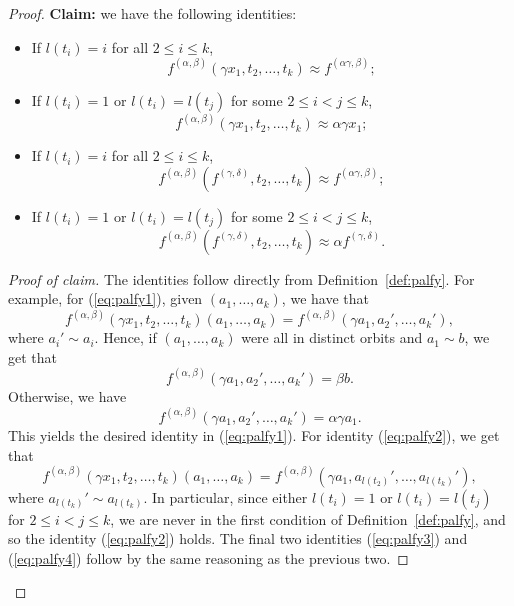 \documentclass[10pt,a4paper]{amsart}
\begin{document}
\begin{proof}
\textbf{Claim:} we have the following identities:
\begin{itemize}
    \item If $l(t_i)=i$ for all $2\leq i\leq k$,
    \begin{equation}\label{eq:palfy1}
        f^{(\alpha, \beta)}(\gamma x_1, t_2, \dots, t_k)\approx f^{(\alpha \gamma, \beta)};
    \end{equation}
    \item If $l(t_i)=1$ or $l(t_i)=l(t_j)$ for some $2\leq i<j\leq k$, 
    \begin{equation}\label{eq:palfy2}
        f^{(\alpha, \beta)}(\gamma x_1, t_2, \dots, t_k)\approx \alpha\gamma x_1;
    \end{equation}
    \item If $l(t_i)=i$ for all $2\leq i\leq k$,
    \begin{equation}\label{eq:palfy3}
        f^{(\alpha, \beta)}(f^{(\gamma, \delta)}, t_2, \dots, t_k)\approx f^{(\alpha \gamma, \beta)};
    \end{equation}
     \item If $l(t_i)=1$ or $l(t_i)=l(t_j)$ for some $2\leq i<j\leq k$, 
    \begin{equation}\label{eq:palfy4}
        f^{(\alpha, \beta)}(f^{(\gamma, \delta)}, t_2, \dots, t_k)\approx \alpha f^{(\gamma, \delta)}.
    \end{equation}
\end{itemize}
\begin{proof}[Proof of claim] The identities follow directly from Definition~\ref{def:palfy}. For example, for (\ref{eq:palfy1}), given $(a_1, \dots, a_k)$, we have that
\[f^{(\alpha, \beta)}(\gamma x_1, t_2, \dots, t_k)(a_1, \dots, a_k)=f^{(\alpha, \beta)}(\gamma a_1, a_2', \dots, a_k'),\]
where $a_i'\sim a_i$. Hence, if $(a_1, \dots, a_k)$ were all in distinct orbits and $a_1\sim b$, we get that 
\[f^{(\alpha, \beta)}(\gamma a_1, a_2', \dots, a_k')=\beta b.\]
Otherwise, we have
\[f^{(\alpha, \beta)}(\gamma a_1, a_2', \dots, a_k')=\alpha\gamma a_1.\]
This yields the desired identity in (\ref{eq:palfy1}). For identity (\ref{eq:palfy2}), we get that 
\[f^{(\alpha, \beta)}(\gamma x_1, t_2, \dots, t_k)(a_1, \dots, a_k)=f^{(\alpha, \beta)}(\gamma a_1, a_{l(t_2)}', \dots, a_{l(t_k)}'),\]
where $a_{l(t_k)}'\sim a_{l(t_k)}$. In particular, since either $l(t_i)=1$ or $l(t_i)=l(t_j)$ for $2\leq i<j\leq k$, we are never in the first condition of Definition~\ref{def:palfy}, and so the identity (\ref{eq:palfy2}) holds. The final two identities (\ref{eq:palfy3}) and (\ref{eq:palfy4}) follow by the same reasoning as the previous two.
\end{proof}
\end{proof}
\end{document}
